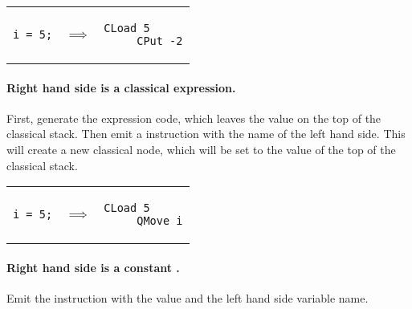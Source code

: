 \begin{center}
\begin{tabular}{p{1in}p{.5in}p{1.5in}}
{\begin{singlespace}
\begin{lstlisting}[style=linqpl]
i = 5;
\end{lstlisting}
\end{singlespace}}
 & { \quad \quad $\implies$} &
{\begin{singlespace}
\begin{lstlisting}[style=linqpl]
     CLoad 5
     CPut -2
\end{lstlisting}
\end{singlespace}}
\end{tabular}
\end{center}


\paragraph{Right hand side is a classical expression.} First, generate the
expression code, which leaves the value on the top of the classical stack.
Then emit a  instruction with the name of the left hand side.
This will create a new classical node, which will be set to the value of the
top of the classical stack.


\begin{center}
\begin{tabular}{p{1in}p{.5in}p{1.5in}}
{\begin{singlespace}
\begin{lstlisting}[style=linqpl]
i = 5;
\end{lstlisting}
\end{singlespace}}
 & { \quad \quad $\implies$} &
{\begin{singlespace}
\begin{lstlisting}[style=linqpl]
     CLoad 5
     QMove i
\end{lstlisting}
\end{singlespace}}
\end{tabular}
\end{center}


\paragraph{Right hand side is a constant \qbit.} Emit the 
 instruction  with the \qbit{} value and the left hand side
variable name.

